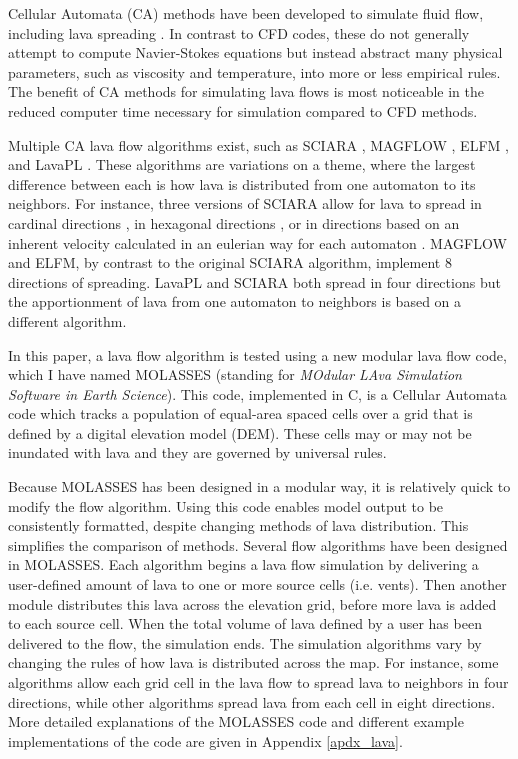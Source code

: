 	Cellular Automata (CA) methods \citep{wolfram1984cellular} have been developed to simulate fluid flow, including lava spreading \citep{barca1994cellular}. In contrast to CFD codes, these do not generally attempt to compute Navier-Stokes equations but instead abstract many physical parameters, such as viscosity and temperature, into more or less empirical rules. The benefit of CA methods for simulating lava flows is most noticeable in the reduced computer time necessary for simulation compared to CFD methods.
	
	Multiple CA lava flow algorithms exist, such as SCIARA \citep{crisci2004simulation}, MAGFLOW \citep{del2008simulations}, ELFM \citep{damiani2006lava}, and LavaPL \citep{connor2012probabilistic}. These algorithms are variations on a theme, where the largest difference between each is how lava is distributed from one automaton to its neighbors. For instance, three versions of SCIARA allow for lava to spread in cardinal directions \citep{barca1994cellular}, in hexagonal directions \citep{crisci2008lava}, or in directions based on an inherent velocity calculated in an eulerian way for each automaton \citep{avolio2006sciara}. MAGFLOW and ELFM, by contrast to the original SCIARA algorithm, implement 8 directions of spreading. LavaPL and SCIARA both spread in four directions but the apportionment of lava from one automaton to neighbors is based on a different algorithm.

	In this paper, a lava flow algorithm is tested using a new modular lava flow code, which I have named MOLASSES (standing for \textit{MOdular LAva Simulation Software in Earth Science}). This code, implemented in C, is a Cellular Automata code which tracks a population of equal-area spaced cells over a grid that is defined by a digital elevation model (DEM). These cells may or may not be inundated with lava and they are governed by universal rules. 
	
	Because MOLASSES has been designed in a modular way, it is relatively quick to modify the flow algorithm. Using this code enables model output to be consistently formatted, despite changing methods of lava distribution. This simplifies the comparison of methods. Several flow algorithms have been designed in MOLASSES. Each algorithm begins a lava flow simulation by delivering a user-defined amount of lava to one or more source cells (i.e. vents). Then another module distributes this lava across the elevation grid, before more lava is added to each source cell. When the total volume of lava defined by a user has been delivered to the flow, the simulation ends. The simulation algorithms vary by changing the rules of how lava is distributed across the map. For instance, some algorithms allow each grid cell in the lava flow to spread lava to neighbors in four directions, while other algorithms spread lava from each cell in eight directions. More detailed explanations of the MOLASSES code and different example implementations of the code are given in Appendix \ref{apdx_lava}.
	
